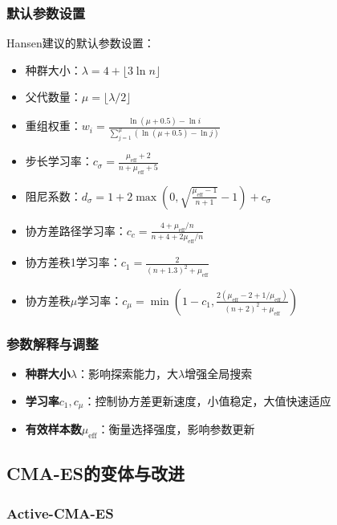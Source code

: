 \subsubsection{默认参数设置}

Hansen建议的默认参数设置：
\begin{itemize}
    \item 种群大小：$\lambda = 4 + \lfloor 3\ln n \rfloor$
    \item 父代数量：$\mu = \lfloor \lambda/2 \rfloor$
    \item 重组权重：$w_i = \frac{\ln(\mu+0.5) - \ln i}{\sum_{j=1}^{\mu} (\ln(\mu+0.5) - \ln j)}$
    \item 步长学习率：$c_\sigma = \frac{\mu_{\text{eff}}+2}{n+\mu_{\text{eff}}+5}$
    \item 阻尼系数：$d_\sigma = 1 + 2\max(0, \sqrt{\frac{\mu_{\text{eff}}-1}{n+1}}-1) + c_\sigma$
    \item 协方差路径学习率：$c_c = \frac{4+\mu_{\text{eff}}/n}{n+4+2\mu_{\text{eff}}/n}$
    \item 协方差秩1学习率：$c_1 = \frac{2}{(n+1.3)^2+\mu_{\text{eff}}}$
    \item 协方差秩$\mu$学习率：$c_\mu = \min(1-c_1, \frac{2(\mu_{\text{eff}}-2+1/\mu_{\text{eff}})}{(n+2)^2+\mu_{\text{eff}}})$
\end{itemize}

\subsubsection{参数解释与调整}

\begin{itemize}
    \item \textbf{种群大小$\lambda$}：影响探索能力，大$\lambda$增强全局搜索
    \item \textbf{学习率$c_1, c_\mu$}：控制协方差更新速度，小值稳定，大值快速适应
    \item \textbf{有效样本数$\mu_{\text{eff}}$}：衡量选择强度，影响参数更新
\end{itemize}

\subsection{CMA-ES的变体与改进}

\subsubsection{Active-CMA-ES}

